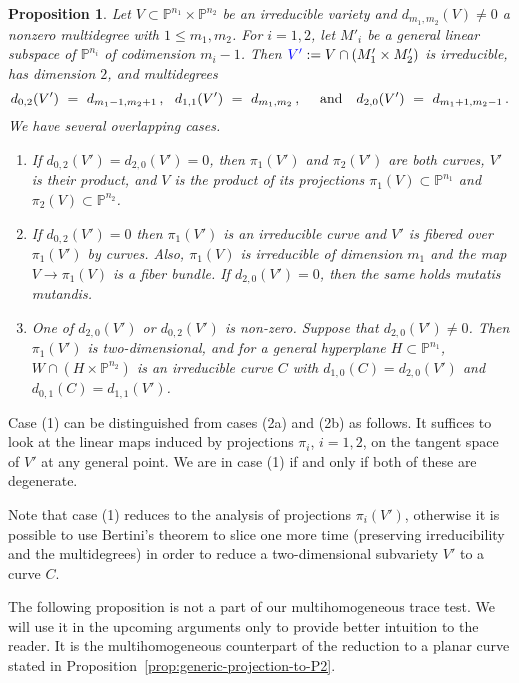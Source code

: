 \documentclass[12pt]{amsart}
\newtheorem{proposition}[theorem]{Proposition}
\theoremstyle{definition}
\begin{document}
\begin{proposition}\label{prop:reduction-to-curve}
 Let $V \subset {{\mathbb{P}}}^{n_1}\times{{\mathbb{P}}}^{n_2}$ be an irreducible variety and $d_{m_1,m_2}(V)\neq 0$ a nonzero multidegree
 with $1\leq m_1,m_2$.
 For $i=1,2$, let $M'_i$ be a general linear subspace of\/ ${{\mathbb{P}}}^{n_i}$ of codimension $m_i{-}1$.
 Then ${{\color{blue}{V'}}}:=V\cap(M'_1\times M'_2)$ is irreducible, has dimension $2$, and multidegrees
\[
  d_{0,2}(V')\ =\ d_{m_1-1,m_2+1}\,,\  \
  d_{1,1}(V')\ =\ d_{m_1,m_2}\,,\  \quad\mbox{\rm and}\quad
  d_{2,0}(V')\ =\ d_{m_1+1,m_2-1}\,.
\]
 We have several overlapping cases.
\begin{enumerate}
\item[(1)] If $d_{0,2}(V')=d_{2,0}(V')=0$, then $\pi_1(V')$ and $\pi_2(V')$ are both curves, $V'$ is their product,
        and $V$ is the product of its projections $\pi_1(V)\subset{{\mathbb{P}}}^{n_1}$ and  $\pi_2(V)\subset{{\mathbb{P}}}^{n_2}$.
\item[(2a)] If $d_{0,2}(V')=0$ then $\pi_1(V')$ is an irreducible curve and $V'$ is fibered over $\pi_1(V')$ by curves.
      Also, $\pi_1(V)$ is irreducible of dimension $m_1$ and the map $V\to\pi_1(V)$ is a fiber bundle.
      If $d_{2,0}(V')=0$, then the same holds {\it mutatis mutandis}.
\item[(2b)] One of  $d_{2,0}(V')$ or $d_{0,2}(V')$ is non-zero.
      Suppose that $d_{2,0}(V')\neq 0$.
      Then $\pi_1(V')$ is two-dimensional, and for a general hyperplane $H\subset{{\mathbb{P}}}^{n_1}$,
      $W \cap (H \times {{\mathbb{P}}}^{n_2})$ is an irreducible curve $C$ with $d_{1,0}(C)=d_{2,0}(V')$ and
      $d_{0,1}(C)=d_{1,1}(V')$.
\end{enumerate}
\end{proposition}

Case (1) can be distinguished from cases (2a) and (2b) as follows. It suffices to look at the linear maps induced by projections $\pi_i$, $i=1,2$,
on the tangent space of $V'$ at any general point. We are in case (1) if and only if both of these are degenerate.

Note that case (1) reduces to the analysis of projections $\pi_i(V')$,
otherwise it is possible to use Bertini's theorem to slice one more time (preserving irreducibility and the multidegrees)
in order to reduce a two-dimensional subvariety $V'$ to a curve $C$.

The following proposition is not a part of our multihomogeneous trace test. We will use it in the upcoming arguments only to provide better intuition to the reader.
It is the multihomogeneous counterpart of the reduction to a planar curve stated in Proposition~\ref{prop:generic-projection-to-P2}.
\end{document}
